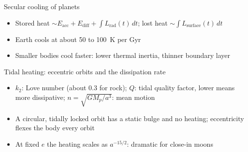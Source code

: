 \documentclass[aspectratio=169, 11pt]{beamer}
\begin{document}
\begin{frame}
\end{frame}

\begin{frame}
\end{frame}

\begin{frame}{Secular cooling of planets}
  \begin{itemize}
    \item Stored heat $\sim E_{\mathrm{acc}} + E_{\mathrm{diff}} + \int L_{\mathrm{rad}}(t)\,dt$; lost heat $\sim \int L_{\mathrm{surface}}(t)\,dt$
    \item Earth cools at about 50 to 100~K per Gyr
    \item Smaller bodies cool faster: lower thermal inertia, thinner boundary layer
  \end{itemize}
  \vskip8pt
\end{frame}

\begin{frame}{Tidal heating: eccentric orbits and the dissipation rate}
  \vskip4pt
  \begin{itemize}\setlength\itemsep{3pt}
    \item $k_2$: Love number (about 0.3 for rock); $Q$: tidal quality factor, lower means more dissipative; $n = \sqrt{GM_p/a^3}$: mean motion
    \item A circular, tidally locked orbit has a static bulge and no heating; eccentricity flexes the body every orbit
    \item At fixed $e$ the heating scales as $a^{-15/2}$: dramatic for close-in moons
  \end{itemize}
\end{frame}
\end{document}
